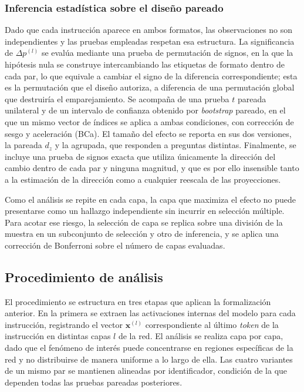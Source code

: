 \documentclass[12pt,a4paper]{article}
\begin{document}
\subsubsection*{Inferencia estadística sobre el diseño pareado}

Dado que cada instrucción aparece en ambos formatos, las observaciones no son independientes y las pruebas empleadas respetan esa estructura. La significancia de $\Delta p^{(l)}$ se evalúa mediante una prueba de permutación de signos, en la que la hipótesis nula se construye intercambiando las etiquetas de formato dentro de cada par, lo que equivale a cambiar el signo de la diferencia correspondiente; esta es la permutación que el diseño autoriza, a diferencia de una permutación global que destruiría el emparejamiento. Se acompaña de una prueba $t$ pareada unilateral y de un intervalo de confianza obtenido por \textit{bootstrap} pareado, en el que un mismo vector de índices se aplica a ambas condiciones, con corrección de sesgo y aceleración (BCa). El tamaño del efecto se reporta en sus dos versiones, la pareada $d_z$ y la agrupada, que responden a preguntas distintas. Finalmente, se incluye una prueba de signos exacta que utiliza únicamente la dirección del cambio dentro de cada par y ninguna magnitud, y que es por ello insensible tanto a la estimación de la dirección como a cualquier reescala de las proyecciones.

Como el análisis se repite en cada capa, la capa que maximiza el efecto no puede presentarse como un hallazgo independiente sin incurrir en selección múltiple. Para acotar ese riesgo, la selección de capa se replica sobre una división de la muestra en un subconjunto de selección y otro de inferencia, y se aplica una corrección de Bonferroni sobre el número de capas evaluadas.

\subsection{Procedimiento de análisis}

\justifying

El procedimiento se estructura en tres etapas que aplican la formalización anterior. En la primera se extraen las activaciones internas del modelo para cada instrucción, registrando el vector $\bm{x}^{(l)}$ correspondiente al último \textit{token} de la instrucción en distintas capas $l$ de la red. El análisis se realiza capa por capa, dado que el fenómeno de interés puede concentrarse en regiones específicas de la red y no distribuirse de manera uniforme a lo largo de ella. Las cuatro variantes de un mismo par se mantienen alineadas por identificador, condición de la que dependen todas las pruebas pareadas posteriores.
\end{document}

